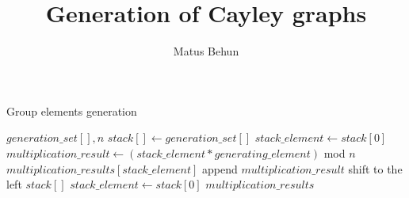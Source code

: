 \documentclass{article}
\begin{document}
\title{Generation of Cayley graphs}
\author{Matus Behun}

\maketitle
\listofalgorithms

\begin{algorithm}
	\caption{Group elements generation}
	\label{alg1}	
	\begin{algorithmic}[1]
		\REQUIRE $generation\_set[], n$
		\STATE $stack[] \leftarrow generation\_set[]$
		\STATE $stack\_element \leftarrow stack[0]$
				\STATE $multiplication\_result \leftarrow (stack\_element * generating\_element)$ mod $n$
				\STATE $multiplication\_results[stack\_element]$ append $multiplication\_result$
			\ENDFOR
			\STATE shift to the left $stack[]$
			\STATE $stack\_element \leftarrow stack[0]$
		\ENDWHILE
		\RETURN $multiplication\_results$
	\end{algorithmic}
\end{algorithm}
\end{document}

